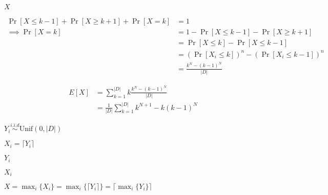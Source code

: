 \documentclass[10pt]{book}
\begin{document}
\begin{mdSnippets}
\begin{mdDisplaySnippet}[8a4286be42af90b937700faa6847e045]
\[\]%
\end{mdDisplaySnippet}%
\begin{mdInlineSnippet}[02129bb861061d1a052c592e2dc6b383]%
$X$\end{mdInlineSnippet}%
\begin{mdDisplaySnippet}%
\[%
\begin{aligned}
\Pr[X \leq k-1] + \Pr[X \geq k+1] + \Pr[X = k] &= 1 \\
\implies \Pr[X = k] &= 1 - \Pr[X \leq k - 1] - \Pr[X \geq k + 1] \\
&= \Pr[X \leq k] - \Pr[X \leq k - 1] \\
&= (\Pr[X_i \leq k])^n - (\Pr[X_i \leq k - 1])^n \\
&= \frac{k^N - (k-1)^N}{|D|}    
\end{aligned}
\]%
\end{mdDisplaySnippet}%
\begin{mdDisplaySnippet}%
\[%
\begin{aligned}
E[X] &= \sum_{k=1}^{|D|} k \frac{k^N - (k-1)^N}{|D|}   \\
&= \frac{1}{|D|} \sum_{k=1}^{|D|} k^{N+1} - k(k-1)^N 
\end{aligned}
\]%
\end{mdDisplaySnippet}%
\begin{mdInlineSnippet}[151cc95763e6626469d2388779b1dfb1]%
$Y_i \stackrel{i.i.d}{\sim} \text{Unif}(0,|D|)$\end{mdInlineSnippet}%
\begin{mdInlineSnippet}[7ea1c95d837e9dd88cc0db9406dededf]%
$X_i = \lceil Y_i \rceil$\end{mdInlineSnippet}%
\begin{mdInlineSnippet}%
$Y_i$\end{mdInlineSnippet}%
\begin{mdInlineSnippet}[a97118fb9e8d7e006a466bfc0771f888]%
$X_i$\end{mdInlineSnippet}%
\begin{mdInlineSnippet}%
$X = \max_i \{X_i \} = \max_i \{ \lceil Y_i \rceil \} = \lceil \max_i \{ Y_i \} \rceil$\end{mdInlineSnippet}%

\end{mdSnippets}
\end{document}
